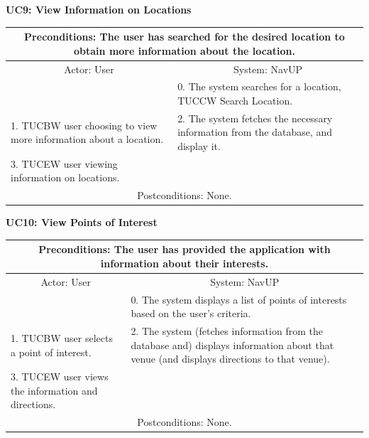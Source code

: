 ﻿\documentclass{article}
\begin{document}
				\vspace{5mm}
                \begin{flushleft}
                \textbf{UC9: View Information on Locations}\\
                \end{flushleft}
        		\centering	
       		 \small
       		 \begin{tabular}{|p{6cm}|p{6cm}|}
       		 \hline
       		 \multicolumn{2}{c}{\parbox{12cm}{\vspace{2mm}Preconditions: The user has searched for the desired location to obtain more information about the location.\vspace{2mm}}} \\
       		 \hline
       		 \multicolumn{1}{c}{Actor: User} & \multicolumn{1}{c}{ System: NavUP} \\
        		\hline
       		& 0.	The system searches for a location, TUCCW Search Location.\\
       		 \hline
       		 1.	TUCBW user choosing to view more information about a location.  & 2.	The system fetches the necessary information from the database, and display it.\\
        		\hline
       		 3.	TUCEW user viewing information on locations. &\\
       		 \hline
        		\multicolumn{2}{c}{Postconditions: None.} \\
        		\hline
        \end{tabular} 
      \newpage
				\vspace{5mm}
                \begin{flushleft}
                \textbf{UC10: View Points of Interest}\\
                \end{flushleft}
        		\centering			
       		 \small
       		 \begin{tabular}{|p{6cm}|p{6cm}|}
       		 \hline
       		\multicolumn{2}{c}{ Preconditions: The user has provided the application with information about their interests.} \\
       		 \hline
       		\multicolumn{1}{c}{Actor: User} & \multicolumn{1}{c}{ System: NavUP} \\
        		\hline
       		 & 0.	The system displays a list of points of interests based on the user's criteria.\\
       		 \hline
       		 1.	TUCBW user selects a point of interest. & 2.	The system (fetches information from the database and) displays information about that venue (and displays directions to that venue).\\
        		\hline
       		 3.	TUCEW user views the information and directions. &\\
       		 \hline
        		\multicolumn{2}{c}{Postconditions: None.} \\
        		\hline
        \end{tabular} 
      
\end{document}
